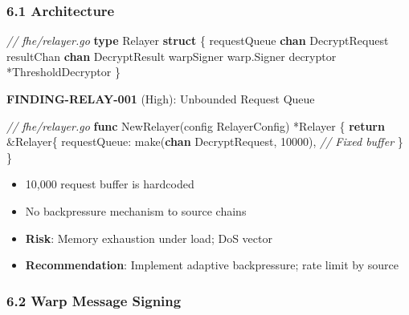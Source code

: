 \documentclass[
]{article}
\newenvironment{Shaded}{}{}
\newcommand{\BuiltInTok}[1]{\textcolor[rgb]{0.00,0.50,0.00}{#1}}
\newcommand{\CommentTok}[1]{\textcolor[rgb]{0.38,0.63,0.69}{\textit{#1}}}
\newcommand{\ControlFlowTok}[1]{\textcolor[rgb]{0.00,0.44,0.13}{\textbf{#1}}}
\newcommand{\DecValTok}[1]{\textcolor[rgb]{0.25,0.63,0.44}{#1}}
\newcommand{\KeywordTok}[1]{\textcolor[rgb]{0.00,0.44,0.13}{\textbf{#1}}}
\newcommand{\NormalTok}[1]{#1}
\newcommand{\OperatorTok}[1]{\textcolor[rgb]{0.40,0.40,0.40}{#1}}
\providecommand{\tightlist}{%
  \setlength{\itemsep}{0pt}\setlength{\parskip}{0pt}}
\begin{document}
\subsubsection{6.1 Architecture}\label{61-architecture}

\begin{Shaded}
\begin{Highlighting}[]
\CommentTok{// fhe/relayer.go}
\KeywordTok{type}\NormalTok{ Relayer }\KeywordTok{struct} \OperatorTok{\{}
\NormalTok{    requestQueue }\KeywordTok{chan}\NormalTok{ DecryptRequest}
\NormalTok{    resultChan   }\KeywordTok{chan}\NormalTok{ DecryptResult}
\NormalTok{    warpSigner   warp}\OperatorTok{.}\NormalTok{Signer}
\NormalTok{    decryptor    }\OperatorTok{*}\NormalTok{ThresholdDecryptor}
\OperatorTok{\}}
\end{Highlighting}
\end{Shaded}

\textbf{FINDING-RELAY-001} (High): Unbounded Request Queue

\begin{Shaded}
\begin{Highlighting}[]
\CommentTok{// fhe/relayer.go}
\KeywordTok{func}\NormalTok{ NewRelayer}\OperatorTok{(}\NormalTok{config RelayerConfig}\OperatorTok{)} \OperatorTok{*}\NormalTok{Relayer }\OperatorTok{\{}
    \ControlFlowTok{return} \OperatorTok{\&}\NormalTok{Relayer}\OperatorTok{\{}
\NormalTok{        requestQueue}\OperatorTok{:} \BuiltInTok{make}\OperatorTok{(}\KeywordTok{chan}\NormalTok{ DecryptRequest}\OperatorTok{,} \DecValTok{10000}\OperatorTok{),}  \CommentTok{// Fixed buffer}
    \OperatorTok{\}}
\OperatorTok{\}}
\end{Highlighting}
\end{Shaded}

\begin{itemize}
\tightlist
\item
  10,000 request buffer is hardcoded
\item
  No backpressure mechanism to source chains
\item
  \textbf{Risk}: Memory exhaustion under load; DoS vector
\item
  \textbf{Recommendation}: Implement adaptive backpressure; rate limit
  by source
\end{itemize}

\subsubsection{6.2 Warp Message Signing}\label{62-warp-message-signing}
\end{document}
